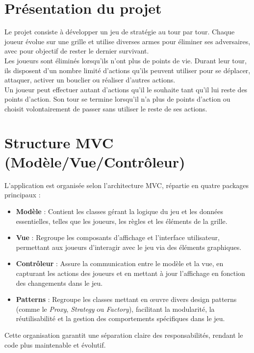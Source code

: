 \documentclass[12pt]{article}
\begin{document}
\section{Présentation du projet}

Le projet consiste à développer un jeu de stratégie au tour par tour. Chaque joueur évolue sur une grille et utilise diverses armes pour éliminer ses adversaires, avec pour objectif de rester le dernier survivant.\\
Les joueurs sont éliminés lorsqu’ils n’ont plus de points de vie. Durant leur tour, ils disposent d’un nombre limité d’actions qu’ils peuvent utiliser pour se déplacer, attaquer, activer un bouclier ou réaliser d’autres actions.\\
Un joueur peut effectuer autant d'actions qu’il le souhaite tant qu’il lui reste des points d’action. Son tour se termine lorsqu’il n’a plus de points d’action ou choisit volontairement de passer sans utiliser le reste de ses actions.

\section{Structure MVC (Modèle/Vue/Contrôleur)}

L'application est organisée selon l'architecture MVC, répartie en quatre packages principaux :  
\begin{itemize}
    \item \textbf{Modèle} : Contient les classes gérant la logique du jeu et les données essentielles, telles que les joueurs, les règles et les éléments de la grille.  
    \item \textbf{Vue} : Regroupe les composants d'affichage et l’interface utilisateur, permettant aux joueurs d’interagir avec le jeu via des éléments graphiques.  
    \item \textbf{Contrôleur} : Assure la communication entre le modèle et la vue, en capturant les actions des joueurs et en mettant à jour l'affichage en fonction des changements dans le jeu.  
    \item \textbf{Patterns} : Regroupe les classes mettant en œuvre divers design patterns (comme le \textit{Proxy}, \textit{Strategy} ou \textit{Factory}), facilitant la modularité, la réutilisabilité et la gestion des comportements spécifiques dans le jeu.  
\end{itemize}

Cette organisation garantit une séparation claire des responsabilités, rendant le code plus maintenable et évolutif.
\end{document}
